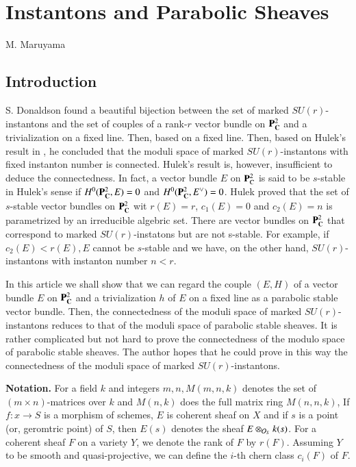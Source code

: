 \chapter{Instantons and Parabolic Sheaves}\label{chap12}

\begin{center}
M. Maruyama
\end{center}

\section*{Introduction}

\setcounter{pageoriginal}{244}
S. Donaldson\pageoriginale  \cite{art12-key1} found a beautiful bijection between the set of marked $SU(r)$-instantons and the set of couples of a rank-$r$  vector bundle on $\mathbf{P}_{\mathbf{C}}^{2}$ and a trivialization on a fixed line. Then, based on a fixed line. Then, based on Hulek's result in \cite{art12-key3}, he concluded that the moduli space of marked $SU(r)$-instantons with fixed instanton number is connected. Hulek's result is, however, insufficient to deduce the connectedness. In fact, a vector bundle $E$ on $\mathbf{P}_{\operatorname{C}}^{2}$ is said to be $s$-stable in Hulek's sense if $H^{0}(\mathbf{P}_{\mathbf{C}}^{2}, E) =0$ and $H^{0}(\mathbf{P}_{\mathbf{C}}^{2}, E^{\vee}) =0$. Hulek \cite{art12-key3} proved that the set of $s$-stable vector bundles on $\mathbf{P}_{\mathbf{C}}^{2}$ wit $r(E) =r$, $c_{1}(E)=0$ and $c_{2}(E)=n$ is parametrized by an irreducible algebric set. There are vector bundles on $\mathbf{P}_{\mathbf{C}}^{2}$ that correspond to marked $SU(r)$-instatons but are not s-stable. For example, if $c_{2}(E) < r(E), E$ cannot be $s$-stable and we have, on the other hand, $SU(r)$-instantons with instanton number $n< r$.

In this article we shall show that we can regard the couple $(E,H)$ of  a vector bundle $E$ on $\mathbf{P}_{\mathbf{C}}^{2}$ and a trivialization $h$ of $E$ on a fixed line as a parabolic stable vector bundle. Then, the connectedness of the moduli space of marked $SU(r)$-instantons reduces to that of the moduli space of parabolic stable sheaves. It is rather complicated but not hard to prove the connectedness of the modulo space of parabolic stable sheaves. The author hopes that he could prove in this way the connectedness of the moduli space of marked $SU(r)$-instantons.

\medskip
\noindent
{\bfseries Notation.} For a field $k$ and integers $m,n, M(m,n,k)$ denotes the set of $(m \times n)$-matrices over $k$ and $M(n,k)$ does the full matrix ring $M(n,n,k)$, If $f : x \rightarrow S$ is a morphism of schemes, $E$ is coherent sheaf on $X$ and if  $s$ is a point (or, geromtric point) of $S$, then $E(s)$ denotes the sheaf $E\otimes_{\mathcal{O}_{S}} k(s)$. For a coherent sheaf $F$ on a variety $Y$, we denote the rank of $F$ by $r(F)$. Assuming $Y$ to be smooth and quasi-projective, we can define the $i$-th chern class $c_{i}(F)$ of $F$.

